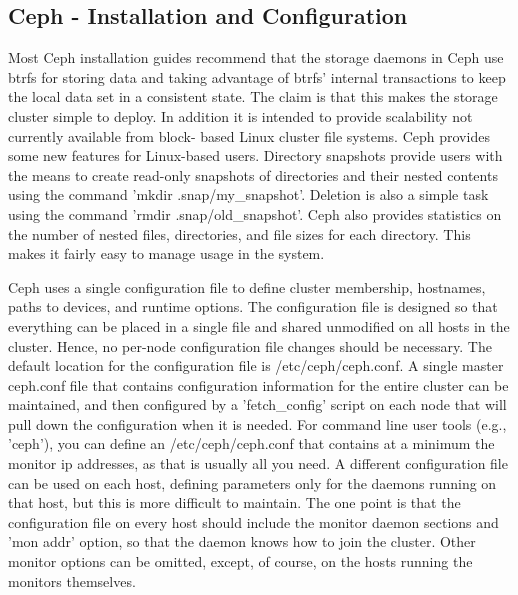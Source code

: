 \documentclass[11pt]{article}
\begin{document}
\subsection{Ceph - Installation and Configuration}
Most Ceph installation guides recommend that the storage daemons in Ceph 
use btrfs for storing data and taking advantage of btrfs' internal 
transactions to keep the local data set in a consistent state. The claim 
is that this makes the storage cluster simple to deploy. In addition it 
is intended to provide scalability not currently available from block-
based Linux cluster file systems. Ceph provides some new features for 
Linux-based users. Directory snapshots provide users with the means to 
create read-only snapshots of directories and their nested contents using 
the command 'mkdir .snap/my_snapshot'.  Deletion is also a simple task 
using the command 'rmdir .snap/old_snapshot'.  Ceph also provides 
statistics on the number of nested files, directories, and file sizes 
for each directory. This makes it fairly easy to manage usage in the 
system.

Ceph uses a single configuration file to define cluster membership, 
hostnames, paths to devices, and runtime options. The configuration 
file is designed so that everything can be placed in a single file and 
shared unmodified on all hosts in the cluster. Hence, no per-node 
configuration file changes should be necessary. The default location 
for the configuration file is /etc/ceph/ceph.conf. A single master 
ceph.conf file that contains configuration information for the entire 
cluster can be maintained, and then configured by  a 'fetch_config' 
script on each node that will pull down the configuration when it is 
needed. For command line user tools (e.g., 'ceph'), you can define an 
/etc/ceph/ceph.conf that contains at a minimum the monitor ip addresses, 
as that is usually all you need. A different configuration file can be 
used on each host, defining parameters only for the daemons running on 
that host, but this is more difficult to maintain. The one point is that 
the configuration file on every host should include the monitor daemon 
sections and 'mon addr' option, so that the daemon knows how to join the 
cluster. Other monitor options can be omitted, except, of course, on the 
hosts running the monitors themselves.
\end{document}
